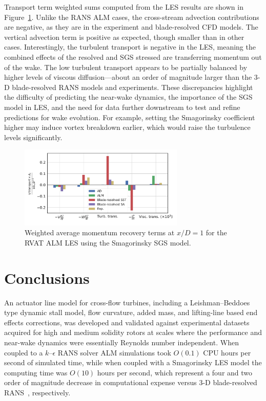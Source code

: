 \documentclass[times]{weauth}
\begin{document}
Transport term weighted sums computed from the LES results are shown in
Figure~\ref{fig:RVAT-ALM-LES-recovery}. Unlike the RANS ALM cases, the
cross-stream advection contributions are negative, as they are in the experiment
and blade-resolved CFD models. The vertical advection term is positive as
expected, though smaller than in other cases. Interestingly, the turbulent
transport is negative in the LES, meaning the combined effects of the resolved
and SGS stressed are transferring momentum out of the wake. The low turbulent
transport appears to be partially balanced by higher levels of viscous
diffusion---about an order of magnitude larger than the 3-D blade-resolved RANS
models and experiments. These discrepancies highlight the difficulty of
predicting the near-wake dynamics, the importance of the SGS model in LES, and
the need for data further downstream to test and refine predictions for wake
evolution. For example, setting the Smagorinsky coefficient higher may induce
vortex breakdown earlier, which would raise the turbulence levels significantly.

\begin{figure}
    \centering

    \includegraphics[width=0.7\textwidth]{RVAT-ALM-LES_recovery-bar-chart}

    \caption{Weighted average momentum recovery terms at $x/D=1$ for the RVAT
        ALM LES using the Smagorinsky SGS model.}

    \label{fig:RVAT-ALM-LES-recovery}
\end{figure}


\section{Conclusions}

An actuator line model for cross-flow turbines, including a Leishman--Beddoes
type dynamic stall model, flow curvature, added mass, and lifting-line based end
effects corrections, was developed and validated against experimental datasets
acquired for high and medium solidity rotors at scales where the performance and
near-wake dynamics were essentially Reynolds number independent. When coupled to
a $k$--$\epsilon$ RANS solver ALM simulations took $O(0.1)$ CPU hours per second
of simulated time, while when coupled with a Smagorinsky LES model the computing
time was $O(10)$ hours per second, which represent a four and two order of
magnitude decrease in computational expense versus 3-D blade-resolved
RANS~\cite{Bachant2016-BR-CFD}, respectively.
\end{document}
